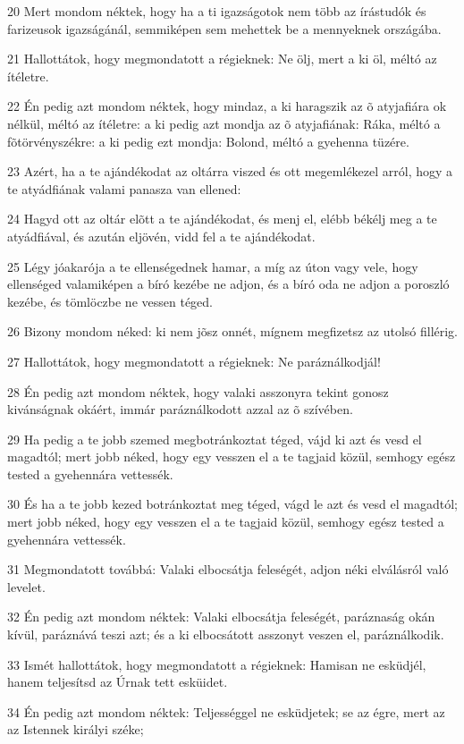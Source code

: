 \par 20 Mert mondom néktek, hogy ha a ti igazságotok nem több az írástudók és farizeusok igazságánál, semmiképen sem mehettek be a mennyeknek országába.
\par 21 Hallottátok, hogy megmondatott a régieknek: Ne ölj, mert a ki öl, méltó az ítéletre.
\par 22 Én pedig azt mondom néktek, hogy mindaz, a ki haragszik az õ atyjafiára ok nélkül, méltó az ítéletre: a ki pedig azt mondja az õ atyjafiának: Ráka, méltó a fõtörvényszékre: a ki pedig ezt mondja: Bolond, méltó a gyehenna tüzére.
\par 23 Azért, ha a te ajándékodat az oltárra viszed és ott megemlékezel arról, hogy a te atyádfiának valami panasza van ellened:
\par 24 Hagyd ott az oltár elõtt a te ajándékodat, és menj el, elébb békélj meg a te atyádfiával, és azután eljövén, vidd fel a te ajándékodat.
\par 25 Légy jóakarója a te ellenségednek hamar, a míg az úton vagy vele, hogy ellenséged valamiképen a bíró kezébe ne adjon, és a bíró oda ne adjon a poroszló kezébe, és tömlöczbe ne vessen téged.
\par 26 Bizony mondom néked: ki nem jõsz onnét, mígnem megfizetsz az utolsó fillérig.
\par 27 Hallottátok, hogy megmondatott a régieknek: Ne paráználkodjál!
\par 28 Én pedig azt mondom néktek, hogy valaki asszonyra tekint gonosz kivánságnak okáért, immár paráználkodott azzal az õ szívében.
\par 29 Ha pedig a te jobb szemed megbotránkoztat téged, vájd ki azt és vesd el magadtól; mert jobb néked, hogy egy vesszen el a te tagjaid közül, semhogy egész tested a gyehennára vettessék.
\par 30 És ha a te jobb kezed botránkoztat meg téged, vágd le azt és vesd el magadtól; mert jobb néked, hogy egy vesszen el a te tagjaid közül, semhogy egész tested a gyehennára vettessék.
\par 31 Megmondatott továbbá: Valaki elbocsátja feleségét, adjon néki elválásról való levelet.
\par 32 Én pedig azt mondom néktek: Valaki elbocsátja feleségét, paráznaság okán kívül, paráznává teszi azt; és a ki elbocsátott asszonyt veszen el, paráználkodik.
\par 33 Ismét hallottátok, hogy megmondatott a régieknek: Hamisan ne esküdjél, hanem teljesítsd az Úrnak tett esküidet.
\par 34 Én pedig azt mondom néktek: Teljességgel ne esküdjetek; se az égre, mert az  az Istennek királyi széke;
